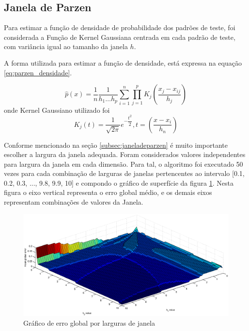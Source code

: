 \subsection{Janela de Parzen}
\label{subsec:exp-janeladeparzen}

Para estimar a função de densidade de probabilidade dos padrões de teste, foi considerada a Função de Kernel Gaussiana centrada em cada padrão de teste, com variância igual ao tamanho da janela $h$.

A forma utilizada para estimar a função de densidade, está expressa na equação \ref{eq:parzen_densidade}.

\begin{equation}
\label{eq:parzen_densidade}
\hat{p}(x) = \dfrac{1}{n} \dfrac{1}{h_1 \ldots h_p} \sum_{i = 1}^{n}\prod_{j = 1}^{p} K_j \left (\dfrac{x_j - x_{ij}}{h_j} \right )
\end{equation}
onde Kernel Gaussiano utilizado foi
\begin{equation}
\label{eq:kernel}
K_j(t) = \dfrac{1}{\sqrt{2\pi}} e^{- \dfrac{t^2}{2}}, t = \left (\dfrac{x - x_i}{h_n} \right)
\end{equation}

Conforme mencionado na seção \ref{subsec:janeladeparzen} é muito importante escolher a largura da janela adequada. Foram considerados valores independentes para largura da janela em cada dimensão. Para tal, o algoritmo foi executado 50 vezes para cada combinação de larguras de janelas pertencentes ao intervalo [0.1, 0.2, 0.3, ..., 9.8, 9.9, 10] e compondo o gráfico de superfície da figura \ref{fig:sup_parzen}. Nesta figura o eixo vertical representa o erro global médio, e os demais eixos representam combinações de valores da Janela.

\begin{figure}[H]
\center
\includegraphics[scale=0.30]{imagens/resultados/globalErrorsPerHValue.eps}
\caption{Gráfico de erro global por larguras de janela}
\label{fig:sup_parzen}
\end{figure}


